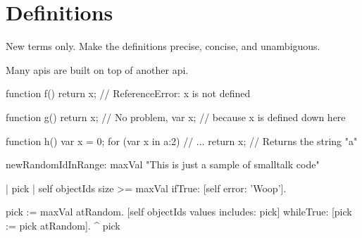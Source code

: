 \chapter{Definitions}
\thispagestyle{fancy}
\label{c:definitions}

New terms only. Make the definitions precise, concise, and unambiguous.

Many \acp{api} are built on top of another \ac{api}.

\begin{javascript}[float=htbp,caption=Scoping in JavaScript,label=l:jsscoping]
function f() {
  return x;   // ReferenceError: x is not defined
}

function g() {
  return x;   // No problem,
  var x;      // because x is defined down here
}

function h() {
  var x = 0;
  for (var x in {a:2}) {
    // ...
  }
  return x;   // Returns the string "a"
}
\end{javascript}

\begin{smalltalk}[float=htbp,caption=Smalltalk Sample]
newRandomIdInRange: maxVal
	"This is just a sample of smalltalk code"
	
	| pick |
	self objectIds size >= maxVal ifTrue: [self error: 'Woop'].
	
	pick := maxVal atRandom.
	[self objectIds values includes: pick] 
		whileTrue: [pick := pick atRandom].
	^  pick
\end{smalltalk}

%

%
%

